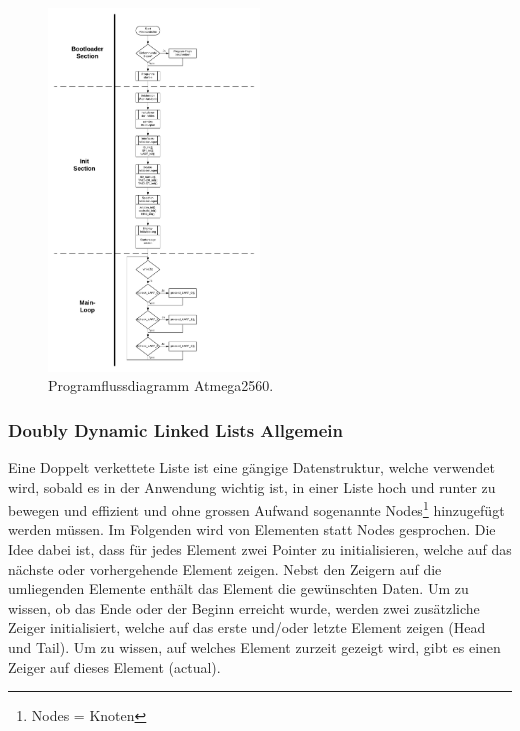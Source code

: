 \begin{figure}[h!]
	\centering
	\includegraphics[width=0.5\textwidth]{graphics/Programmfluss_Atmega2560.pdf}
	\caption{Programflussdiagramm Atmega2560.}
	\label{fig:Programmfluss_Atmega2560}
\end{figure}
\newpage


\subsubsection{Doubly Dynamic Linked Lists Allgemein}

Eine Doppelt verkettete Liste ist eine gängige Datenstruktur, welche verwendet wird, sobald es in der Anwendung wichtig ist, in einer Liste hoch und runter zu bewegen und effizient und ohne grossen Aufwand sogenannte Nodes\footnote{Nodes = Knoten} hinzugefügt werden müssen. Im Folgenden wird von Elementen statt Nodes gesprochen. Die Idee dabei ist, dass für jedes Element zwei Pointer zu initialisieren, welche auf das nächste oder vorhergehende Element zeigen. Nebst den Zeigern auf die umliegenden Elemente enthält das Element die gewünschten Daten. Um zu wissen, ob das Ende oder der Beginn erreicht wurde, werden zwei zusätzliche Zeiger initialisiert, welche auf das erste und/oder letzte Element zeigen (Head und Tail). Um zu wissen, auf welches Element zurzeit gezeigt wird, gibt es einen Zeiger auf dieses Element (actual).



